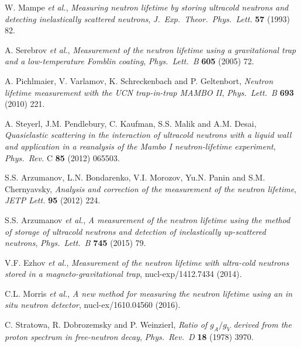 \documentclass{PoS}
\newcommand{\etal}{\textsl{et al.}}
\newcommand{\PR}{Phys.\ Rev.}
\begin{document}
\begin{thebibliography}{99}

 W. Mampe \etal,
  \emph{Measuring neutron lifetime by storing ultracold neutrons
        and detecting inelastically scattered neutrons},
  \emph{J.\ Exp.\ Theor.\ Phys.\ Lett.} \textbf{57} (1993) 82.

 A. Serebrov \etal, \emph{Measurement of the neutron
  lifetime using a gravitational trap and a low-temperature Fomblin
  coating}, \emph{Phys.\ Lett.\ B} \textbf{605} (2005) 72.

 A. Pichlmaier, V. Varlamov, K. Schreckenbach and
  P. Geltenbort, \emph{Neutron lifetime measurement with the UCN
    trap-in-trap MAMBO II}, \emph{Phys.\ Lett.\ B} \textbf{693} (2010)
  221.

 A. Steyerl, J.M. Pendlebury, C. Kaufman, S.S. Malik and
  A.M. Desai, \emph{Quasielastic scattering in the interaction of
    ultracold neutrons with a liquid wall and application in a
    reanalysis of the Mambo I neutron-lifetime experiment}, \emph{\PR} C
  \textbf{85} (2012) 065503.

 S.S. Arzumanov, L.N. Bondarenko, V.I. Morozov,
  Yu.N. Panin and S.M. Chernyavsky, \emph{Analysis and correction of the
    measurement of the neutron lifetime}, \emph{JETP Lett.} \textbf{95}
  (2012) 224.
  
 S.S. Arzumanov \etal,
  \emph{A measurement of the neutron lifetime using the method
        of storage of ultracold neutrons and detection of
        inelastically up-scattered neutrons},
  \emph{Phys.\ Lett.\ B} \textbf{745} (2015) 79.


 V.F. Ezhov \etal, \emph{Measurement of the neutron
  lifetime with ultra-cold neutrons stored in a magneto-gravitational
  trap}, nucl-exp/1412.7434 (2014).
  
 C.L. Morris \etal, \emph{A new method for measuring the
  neutron lifetime using an in situ neutron detector},
  nucl-ex/1610.04560 (2016).


 C. Stratowa, R. Dobrozemsky and P. Weinzierl,
  \emph{Ratio of $g_A/g_V$ derived from the proton spectrum in
    free-neutron decay}, \emph{\PR\ D} \textbf{18} (1978) 3970.


\end{thebibliography}
\end{document}

